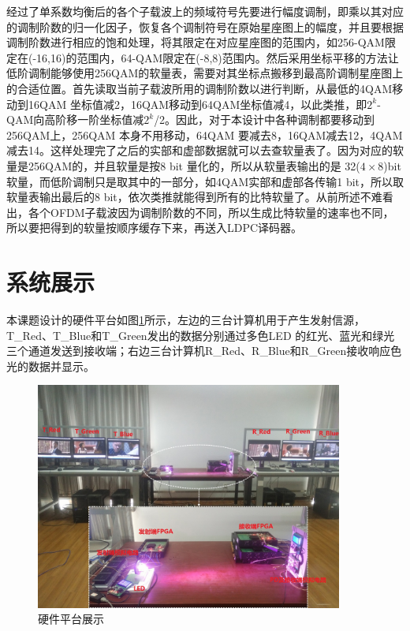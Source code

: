 经过了单系数均衡后的各个子载波上的频域符号先要进行幅度调制，即乘以其对应的调制阶数的归一化因子，恢复各个调制符号在原始星座图上的幅度，并且要根据调制阶数进行相应的饱和处理，将其限定在对应星座图的范围内，如256-QAM限定在(-16,16)的范围内，64-QAM限定在(-8,8)范围内。然后采用坐标平移的方法让低阶调制能够使用256QAM的软量表，需要对其坐标点搬移到最高阶调制星座图上的合适位置。首先读取当前子载波所用的调制阶数以进行判断，从最低的4QAM移动到16QAM 坐标值减2，16QAM移动到64QAM坐标值减4，以此类推，即$2^k$-QAM向高阶移一阶坐标值减$2^k$/2。因此，对于本设计中各种调制都要移动到256QAM上，256QAM 本身不用移动，64QAM 要减去8，16QAM减去12，4QAM减去14。这样处理完了之后的实部和虚部数据就可以去查软量表了。因为对应的软量是256QAM的，并且软量是按8 bit 量化的，所以从软量表输出的是 32($4\times 8$)bit软量，而低阶调制只是取其中的一部分，如4QAM实部和虚部各传输1 bit，所以取软量表输出最后的8 bit，依次类推就能得到所有的比特软量了。从前所述不难看出，各个OFDM子载波因为调制阶数的不同，所以生成比特软量的速率也不同，所以要把得到的软量按顺序缓存下来，再送入LDPC译码器。

\section{系统展示}
本课题设计的硬件平台如图\ref{fig:Demo}所示，左边的三台计算机用于产生发射信源，T\_Red、T\_Blue和T\_Green发出的数据分别通过多色LED 的红光、蓝光和绿光三个通道发送到接收端；右边三台计算机R\_Red、R\_Blue和R\_Green接收响应色光的数据并显示。

\begin{figure}[htbp]
\centering
\includegraphics[width=0.9\textwidth]{figures/chapter-5/Demo.jpg}
\caption{硬件平台展示}
\label{fig:Demo}
\end{figure}


